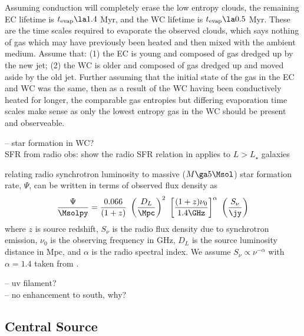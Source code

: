 \documentclass{emulateapj}
\begin{document}
Assuming conduction will completely erase the low entropy clouds, the
remaining EC lifetime is $t_{\mathrm{evap}} \la 1.4$ Myr, and the WC
lifetime is $t_{\mathrm{evap}} \la 0.5$ Myr. These are the time scales
required to evaporate the observed clouds, which says nothing of gas
which may have previously been heated and then mixed with the ambient
medium. Assume that: (1) the EC is young and composed of gas dredged
up by the new jet; (2) the WC is older and composed of gas dredged up
and moved aside by the old jet. Further assuming that the initial
state of the gas in the EC and WC was the same, then as a result of
the WC having been conductively heated for longer, the comparable gas
entropies but differing evaporation time scales make sense as only the
lowest entropy gas in the WC should be present and observeable.

-- star formation in WC?\\
SFR from radio obs: \citep{1992ARA&A..30..575C}
\citet{2009MNRAS.397.1101G} show the radio SFR relation in
\citet{2003ApJ...586..794B} applies to $L > L_{\star}$ galaxies

relating radio synchrotron luminosity to massive ($M \ga 5 \Msol$)
star formation rate, $\Psi$, can be written in terms of observed flux
density as
\begin{equation}
  \frac{\Psi}{\Msolpy} =
  \frac{0.066}{(1+z)}~\left(\frac{D_L}{\Mpc}\right)^2~\left[\frac{(1+z)\nu_0}{1.4
      \GHz}\right]^{\alpha}~\left(\frac{S_{\nu}}{\jy}\right) \nonumber
\end{equation}
where $z$ is source redshift, $S_{\nu}$ is the radio flux density due
to synchrotron emission, $\nu_0$ is the observing frequency in GHz,
$D_L$ is the source luminosity distance in Mpc, and $\alpha$ is the
radio spectral index. We assume $S_{\nu} \propto \nu^{-\alpha}$ with
$\alpha = 1.4$ taken from \citet{1993ApJ...415...82H}.

-- uv filament?\\
-- no enhancement to south, why?\\

\subsection{Central Source}
\label{sec:centsrc}
\end{document}
